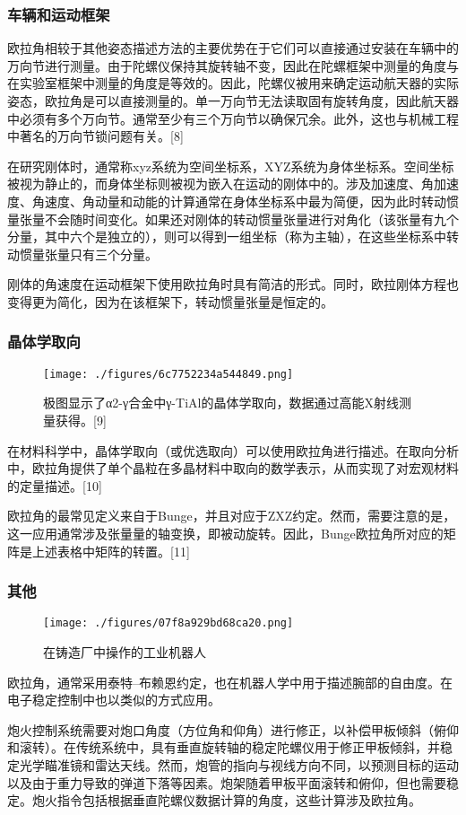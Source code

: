 \subsubsection{车辆和运动框架}
欧拉角相较于其他姿态描述方法的主要优势在于它们可以直接通过安装在车辆中的万向节进行测量。由于陀螺仪保持其旋转轴不变，因此在陀螺框架中测量的角度与在实验室框架中测量的角度是等效的。因此，陀螺仪被用来确定运动航天器的实际姿态，欧拉角是可以直接测量的。单一万向节无法读取固有旋转角度，因此航天器中必须有多个万向节。通常至少有三个万向节以确保冗余。此外，这也与机械工程中著名的万向节锁问题有关。[8]

在研究刚体时，通常称xyz系统为空间坐标系，XYZ系统为身体坐标系。空间坐标被视为静止的，而身体坐标则被视为嵌入在运动的刚体中的。涉及加速度、角加速度、角速度、角动量和动能的计算通常在身体坐标系中最为简便，因为此时转动惯量张量不会随时间变化。如果还对刚体的转动惯量张量进行对角化（该张量有九个分量，其中六个是独立的），则可以得到一组坐标（称为主轴），在这些坐标系中转动惯量张量只有三个分量。

刚体的角速度在运动框架下使用欧拉角时具有简洁的形式。同时，欧拉刚体方程也变得更为简化，因为在该框架下，转动惯量张量是恒定的。
\subsubsection{晶体学取向}
\begin{figure}[ht]
\centering
\texttt{[image: ./figures/6c7752234a544849.png]}
\caption{极图显示了α2-γ合金中γ-TiAl的晶体学取向，数据通过高能X射线测量获得。[9]} \label{fig_OLJ_13}
\end{figure}
在材料科学中，晶体学取向（或优选取向）可以使用欧拉角进行描述。在取向分析中，欧拉角提供了单个晶粒在多晶材料中取向的数学表示，从而实现了对宏观材料的定量描述。[10]

欧拉角的最常见定义来自于Bunge，并且对应于ZXZ约定。然而，需要注意的是，这一应用通常涉及张量量的轴变换，即被动旋转。因此，Bunge欧拉角所对应的矩阵是上述表格中矩阵的转置。[11]
\subsubsection{其他}
\begin{figure}[ht]
\centering
\texttt{[image: ./figures/07f8a929bd68ca20.png]}
\caption{在铸造厂中操作的工业机器人} \label{fig_OLJ_14}
\end{figure}
欧拉角，通常采用泰特–布赖恩约定，也在机器人学中用于描述腕部的自由度。在电子稳定控制中也以类似的方式应用。

炮火控制系统需要对炮口角度（方位角和仰角）进行修正，以补偿甲板倾斜（俯仰和滚转）。在传统系统中，具有垂直旋转轴的稳定陀螺仪用于修正甲板倾斜，并稳定光学瞄准镜和雷达天线。然而，炮管的指向与视线方向不同，以预测目标的运动以及由于重力导致的弹道下落等因素。炮架随着甲板平面滚转和俯仰，但也需要稳定。炮火指令包括根据垂直陀螺仪数据计算的角度，这些计算涉及欧拉角。

